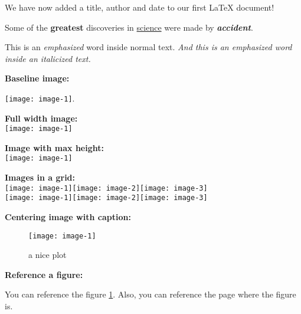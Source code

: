 




\maketitle
 
We have now added a title, author and date to our first \LaTeX{} document!

Some of the \textbf{greatest}
discoveries in \underline{science} 
were made by \textbf{\textit{accident}}.

This is an \emph{emphasized} word inside normal text. \textit{And this is an \emph{emphasized} word inside an italicized text.}

\textbf{Baseline image:}

\blindtext\texttt{[image: image-1]}.

\newpage

\textbf{Full width image:}
\\ %
\texttt{[image: image-1]}

\textbf{Image with max height:}
\\
\texttt{[image: image-1]}

\newpage

\textbf{Images in a grid:}
\\
\texttt{[image: image-1]}\quad\texttt{[image: image-2]}\quad\texttt{[image: image-3]}
\\[\baselineskip]%
\texttt{[image: image-1]}\quad\texttt{[image: image-2]}\quad\texttt{[image: image-3]}

\textbf{Centering image with caption:}
\\
\begin{figure}[h]
  \centering
  \texttt{[image: image-1]}
  \caption{a nice plot}
  \label{fig:image1}
\end{figure}

\textbf{Reference a figure:}

You can reference the figure \ref{fig:image1}. Also, you can reference the page \pageref{fig:image1} where the figure is.

